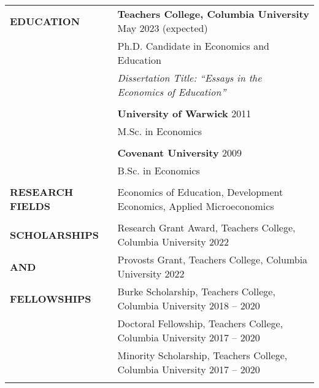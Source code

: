 \documentclass[letterpaper, 11pt]{article}
\begin{document}
\begin{longtable}{p{1.2in}p{4.8in}}


{\textbf{EDUCATION}} 
& \textbf{Teachers College, Columbia University} \hfill May 2023 (expected) \\ 
& Ph.D. Candidate in Economics and Education \hfill  \\
&  {\it Dissertation Title: ``Essays in the Economics of Education''}\\
& \\

& \textbf{University of Warwick} \hfill 2011 \\
& M.Sc. in Economics \hfill  \\
& \\

& \textbf{Covenant University} \hfill 2009 \\
& B.Sc. in Economics \hfill  \\
& \\


\nohyphens{{\textbf{RESEARCH FIELDS}}}
& Economics of Education, Development Economics, Applied Microeconomics  \\
\\


{{\textbf{SCHOLARSHIPS}}} 
& Research Grant Award, Teachers College, Columbia University \hfill 2022\\
{{\textbf{AND}}} 
& Provosts Grant, Teachers College, Columbia University \hfill 2022 \\
{{\textbf{FELLOWSHIPS}}} 
& Burke Scholarship, Teachers College, Columbia University \hfill 2018 -- 2020 \\
& Doctoral Fellowship, Teachers College, Columbia University \hfill 2017 -- 2020 \\
& Minority Scholarship, Teachers College, Columbia University \hfill 2017 -- 2020 \\
& \\



\end{longtable}
\end{document}
